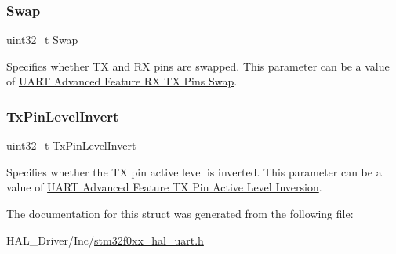 \subsubsection{\texorpdfstring{Swap}{Swap}}
{\footnotesize\ttfamily uint32\+\_\+t Swap}

Specifies whether TX and RX pins are swapped. This parameter can be a value of \hyperlink{group___u_a_r_t___rx___tx___swap}{U\+A\+RT Advanced Feature RX TX Pins Swap}. \mbox{\label{struct_u_a_r_t___adv_feature_init_type_def_a60e165495975a7d568a8ffad4e8d8d82}} 
\subsubsection{\texorpdfstring{Tx\+Pin\+Level\+Invert}{TxPinLevelInvert}}
{\footnotesize\ttfamily uint32\+\_\+t Tx\+Pin\+Level\+Invert}

Specifies whether the TX pin active level is inverted. This parameter can be a value of \hyperlink{group___u_a_r_t___tx___inv}{U\+A\+RT Advanced Feature TX Pin Active Level Inversion}. 

The documentation for this struct was generated from the following file\+:\begin{DoxyCompactItemize}
\item 
H\+A\+L\+\_\+\+Driver/\+Inc/\hyperlink{stm32f0xx__hal__uart_8h}{stm32f0xx\+\_\+hal\+\_\+uart.\+h}\end{DoxyCompactItemize}
